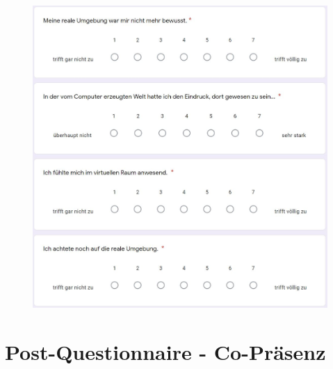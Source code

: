 \documentclass[a4paper,11pt]{article}%
\renewcommand{\\}{\vspace*{0.5\baselineskip} \newline}
\begin{document}
	\begin{figure}[H]
		\begin{footnotesize}
			\includegraphics[width=\textwidth]{Abbildungen/Fragebogen/Post-Questionnaire/PQP3}
		\end{footnotesize}
	\end{figure}	

\newpage
\section{Post-Questionnaire - Co-Präsenz}			
\label{Post-Questionnaire - Co-Präsenz}		
\end{document}
